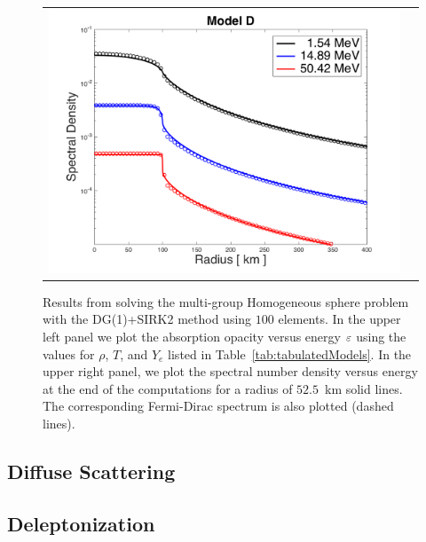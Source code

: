 \documentclass[10pt,preprint]{aastex}
\begin{document}
\begin{figure}
\begin{center}
\begin{tabular}{cc}
      \includegraphics[scale=0.4]{./Figures/HomogeneousSphere_VsRadius_D}
    \end{tabular}
  \end{center}
  \caption{Results from solving the multi-group Homogeneous sphere problem with the DG(1)+SIRK2 method using $100$ elements.
    In the upper left panel we plot the absorption opacity versus energy $\varepsilon$ using the values for $\rho$, $T$, and $Y_{e}$ listed in Table~\ref{tab:tabulatedModels}. In the upper right panel, we plot the spectral number density versus energy at the end of the computations for a radius of $52.5$~km solid lines.  The corresponding Fermi-Dirac spectrum is also plotted (dashed lines).  }
  \label{fig:homogeneousSphere1D_weaklib}
\end{figure}

\subsection{Diffuse Scattering}

\subsection{Deleptonization}
\end{document}
